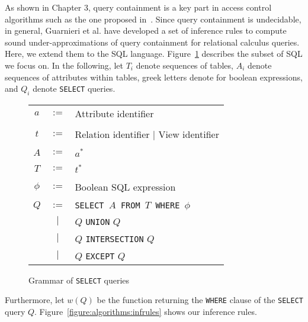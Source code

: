 As shown in Chapter 3, query containment is a key part in access control algorithms such as the one proposed in~\cite{guarnieri2016strong}.
Since query containment is undecidable, in general, Guarnieri et al. have developed a set of inference rules to compute sound under-approximations of query containment for relational calculus queries.
%
Here, we extend them to the SQL language.
%
Figure~\ref{figure:algorithms:grammar} describes the subset of SQL we focus on. 
%
In the following, let $T_i$ denote sequences of tables, $A_i$ denote sequences of attributes within tables, greek letters denote for boolean expressions, and $Q_i$ denote \texttt{SELECT} queries.


\begin{figure}[!ht]

\begin{tabular}{c c l}
$a$ & $:=$ & Attribute identifier \\
    & & \\
$t$ & $:=$ & Relation identifier $|$ View identifier \\ \\

$A$ & $:=$ & $a^*$ \\
    & & \\
$T$ & $:=$ &  $t^*$ \\
    & & \\
$\phi$ & $:=$ & Boolean SQL expression  \\
    & & \\
$Q$ & $:=$ & \texttt{SELECT $A$ FROM $T$ WHERE $\phi$} \\
    & $|$  & $Q$ \texttt{UNION} $Q$ \\
    & $|$  & $Q$ \texttt{INTERSECTION} $Q$ \\
    & $|$  & $Q$ \texttt{EXCEPT} $Q$ \\

\end{tabular}
\caption{Grammar of \texttt{SELECT} queries}
\label{figure:algorithms:grammar}
\end{figure}
%
Furthermore, let $w(Q)$ be the function returning the \texttt{WHERE} clause of the \texttt{SELECT} query $Q$.
%
Figure~\ref{figure:algorithms:infrules} shows our inference rules.
%
